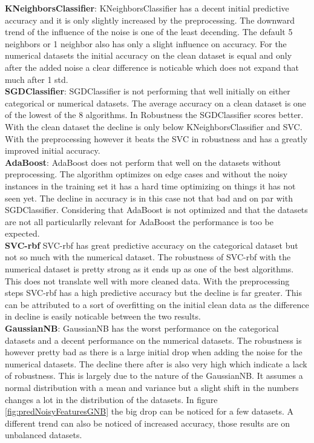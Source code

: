 \documentclass[a4paper,10pt]{article}
\begin{document}
\textbf{KNeighborsClassifier}: KNeighborsClassifier has a decent initial predictive accuracy and it is only slightly increased by the preprocessing. The downward trend of the influence of the noise is one of the least decending. The default 5 neighbors or 1 neighbor also has only a slight influence on accuracy. For the numerical datasets the initial accuracy on the clean dataset is equal and only after the added noise a clear difference is noticable which does not expand that much after 1 std.\\

\textbf{SGDClassifier}: SGDClassifier is not performing that well initially on either categorical or numerical datasets. The average accuracy on a clean dataset is one of the lowest of the 8 algorithms. In Robustness the SGDClassifier scores better. With the clean dataset the decline is only below KNeighborsClassifier and SVC. With the preprocessing however it beats the SVC in robustness and has a greatly improved initial accuracy. \\

\textbf{AdaBoost}: AdaBoost does not perform that well on the datasets without preprocessing. The algorithm optimizes on edge cases and without the noisy instances in the training set it has a hard time optimizing on things it has not seen yet. The decline in accuracy is in this case not that bad and on par with SGDClassifier. Considering that AdaBoost is not optimized and that the datasets are not all particularlly relevant for AdaBoost the performance is too be expected.\\

\textbf{SVC-rbf} SVC-rbf has great predictive accuracy on the categorical dataset but not so much with the numerical dataset. The robustness of SVC-rbf with the numerical dataset is pretty strong as it ends up as one of the best algorithms. This does not translate well with more cleaned data. With the preprocessing steps SVC-rbf has a high predictive accuracy but the decline is far greater. This can be attributed to a sort of overfitting on the initial clean data as the difference in decline is easily noticable between the two results. \\

\textbf{GaussianNB}: GaussianNB has the worst performance on the categorical datasets and a decent performance on the numerical datasets. The robustness is however pretty bad as there is a large initial drop when adding the noise for the numerical datasets. The decline there after is also very high which indicate a lack of robustness. This is largely due to the nature of the GaussianNB. It assumes a normal distribution with a mean and variance but a slight shift in the numbers changes a lot in the distribution of the datasets. In figure \ref{fig:predNoisyFeaturesGNB} the big drop can be noticed for a few datasets. A different trend can also be noticed of increased accuracy, those results are on unbalanced datasets. \\
\end{document}
